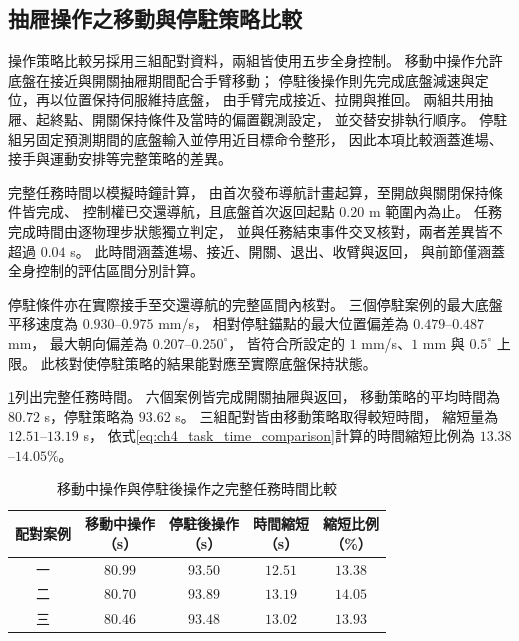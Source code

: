 \subsection{抽屜操作之移動與停駐策略比較}
\label{subsec:moving_parked_drawer_strategy}

操作策略比較另採用三組配對資料，兩組皆使用五步全身控制。
移動中操作允許底盤在接近與開關抽屜期間配合手臂移動；
停駐後操作則先完成底盤減速與定位，再以位置保持伺服維持底盤，
由手臂完成接近、拉開與推回。
兩組共用抽屜、起終點、開關保持條件及當時的偏置觀測設定，
並交替安排執行順序。
停駐組另固定預測期間的底盤輸入並停用近目標命令整形，
因此本項比較涵蓋進場、接手與運動安排等完整策略的差異。

完整任務時間以模擬時鐘計算，
由首次發布導航計畫起算，至開啟與關閉保持條件皆完成、
控制權已交還導航，且底盤首次返回起點 $0.20$ m 範圍內為止。
任務完成時間由逐物理步狀態獨立判定，
並與任務結束事件交叉核對，兩者差異皆不超過 $0.04$ s。
此時間涵蓋進場、接近、開關、退出、收臂與返回，
與前節僅涵蓋全身控制的評估區間分別計算。

停駐條件亦在實際接手至交還導航的完整區間內核對。
三個停駐案例的最大底盤平移速度為 $0.930$--$0.975$ mm/s，
相對停駐錨點的最大位置偏差為 $0.479$--$0.487$ mm，
最大朝向偏差為 $0.207$--$0.250^\circ$，
皆符合所設定的 $1$ mm/s、$1$ mm 與 $0.5^\circ$ 上限。
此核對使停駐策略的結果能對應至實際底盤保持狀態。

\cref{tab:ch4_moving_parked_drawer_results}列出完整任務時間。
六個案例皆完成開關抽屜與返回，
移動策略的平均時間為 $80.72$ s，停駐策略為 $93.62$ s。
三組配對皆由移動策略取得較短時間，
縮短量為 $12.51$--$13.19$ s，
依式\eqref{eq:ch4_task_time_comparison}計算的時間縮短比例為 $13.38$--$14.05\%$。

\begin{table}[htbp]
    \centering
    \caption{移動中操作與停駐後操作之完整任務時間比較}
    \label{tab:ch4_moving_parked_drawer_results}
    \begingroup
    \small
    \setlength{\tabcolsep}{5pt}
    \renewcommand{\arraystretch}{1.25}
    \begin{tabular}{c c c c c}
        \hline
        配對案例
        & \shortstack{移動中操作\\（s）}
        & \shortstack{停駐後操作\\（s）}
        & \shortstack{時間縮短\\（s）}
        & \shortstack{縮短比例\\（\%）} \\
        \hline
        一 & $80.99$ & $93.50$ & $12.51$ & $13.38$ \\
        二 & $80.70$ & $93.89$ & $13.19$ & $14.05$ \\
        三 & $80.46$ & $93.48$ & $13.02$ & $13.93$ \\
        \hline
    \end{tabular}
    \endgroup
\end{table}

